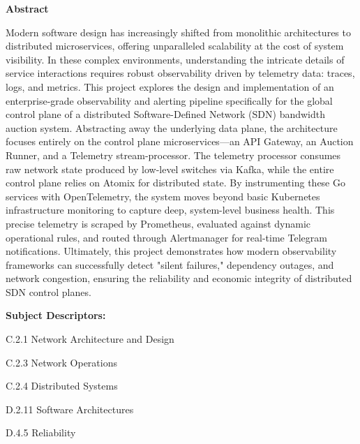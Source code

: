 \documentclass[11pt, a4paper]{article}
\begin{document}

\clearpage
{}
{}
\begin{center}
    \Large \textbf{Abstract}
\end{center}
\onehalfspacing 

Modern software design has increasingly shifted from monolithic architectures to distributed microservices, offering unparalleled scalability at the cost of system visibility. In these complex environments, understanding the intricate details of service interactions requires robust observability driven by telemetry data: traces, logs, and metrics. This project explores the design and implementation of an enterprise-grade observability and alerting pipeline specifically for the global control plane of a distributed Software-Defined Network (SDN) bandwidth auction system. Abstracting away the underlying data plane, the architecture focuses entirely on the control plane microservices—an API Gateway, an Auction Runner, and a Telemetry stream-processor. The telemetry processor consumes raw network state produced by low-level switches via Kafka, while the entire control plane relies on Atomix for distributed state. By instrumenting these Go services with OpenTelemetry, the system moves beyond basic Kubernetes infrastructure monitoring to capture deep, system-level business health. This precise telemetry is scraped by Prometheus, evaluated against dynamic operational rules, and routed through Alertmanager for real-time Telegram notifications. Ultimately, this project demonstrates how modern observability frameworks can successfully detect "silent failures," dependency outages, and network congestion, ensuring the reliability and economic integrity of distributed SDN control planes.

\vspace{1cm}

\noindent \textbf{Subject Descriptors:}\par
\qquad \qquad C.2.1 Network Architecture and Design \par
\qquad \qquad C.2.3 Network Operations\par
\qquad \qquad C.2.4 Distributed Systems \par
\qquad \qquad D.2.11 Software Architectures \par
\qquad \qquad D.4.5 Reliability
\end{document}
